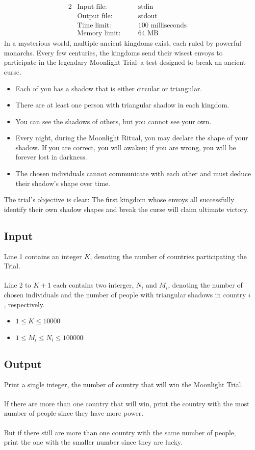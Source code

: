 \documentclass[12pt,a4paper]{article}
\begin{document}
\begin{alignat*} {2}
 &   \text{Input file:}   \quad     &&\text{stdin}\\
 &   \text{Output file:}  \quad     &&\text{stdout}\\
 &   \text{Time limit:}   \quad     &&\text{100 milliseconds}\\
 &   \text{Memory limit:} \quad     &&\text{64 MB}
\end{alignat*}
\noindent
In a mysterious world, multiple ancient kingdoms exist, each ruled by powerful monarchs. Every few centuries, the kingdoms send their wisest envoys to participate in the legendary Moonlight Trial--a test designed to break an ancient curse.
\begin{itemize}
    \item Each of you has a shadow that is either circular or triangular.
    \item There are at least one person with triangular shadow in each kingdom.
    \item You can see the shadows of others, but you cannot see your own.
    \item Every night, during the Moonlight Ritual, you may declare the shape of your shadow. If you are correct, you will awaken; if you are wrong, you will be forever lost in darkness.
    \item The chosen individuals cannot communicate with each other and must deduce their shadow's shape over time.  
\end{itemize}
\noindent
The trial's objective is clear:
The first kingdom whose envoys all successfully identify their own shadow shapes and break the curse will claim ultimate victory.

\subsection*{\fontsize{16}{12}Input}
Line 1 contains an integer $K$, denoting the number of countries participating the Trial.
\\\\
\noindent
Line 2 to $K + 1$ each contains two interger, $N_i$ and $M_i$, denoting the number of chosen individuals and the number of people with triangular shadows in country $i$, respectively.
\begin{itemize}
    \item $1 \leq K \leq 10000$
    \item $1 \leq M_i \leq N_i \leq 100000$
\end{itemize}
\subsection*{\fontsize{16}{12}Output}
Print a single integer, the number of country that will win the Moonlight Trial. 
\\\\
\noindent
If there are more than one country that will win, print the country with the most number of people since they have more power. 
\\\\
\noindent
But if there still are more than one country with the same number of people, print the one with the smaller number since they are lucky.
\end{document}
